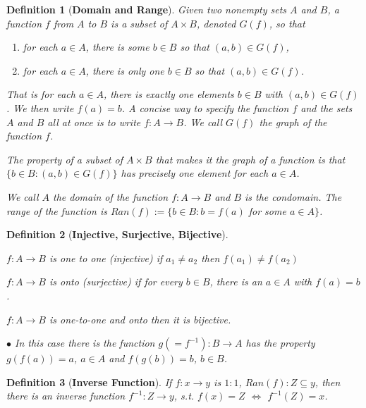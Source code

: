 \documentclass[12pt]{article}
\theoremstyle{plain}
\newtheorem{definition}{Definition}[section]
\begin{document}
	\begin{definition}[\textbf{Domain and Range}]
		Given two nonempty sets $A$ and $B$, a function $f$ from $A$ to $B$ is a 
		subset of $A \times B$, denoted $G(f)$, so that
		\begin{enumerate}
			\item for each $a\in A$, there is some $b\in B$ so that $(a,b) \in G(f)$,
			\item for each $a\in A$, there is only one $b\in B$ so that $(a,b) \in 
				G(f)$.
		\end{enumerate}
		That is for each $a\in A$, there is exactly one elements $b\in B$ with 
		$(a,b)\in G(f)$. We then write $f(a)=b$. A concise way to specify the 
		function $f$ and the sets $A$ and $B$ all at once is to write $f:A\to B$.
		We call $G(f)$ the graph of the function $f$. 

		The property of a subset of $A\times B$ that makes it the graph of a 
		function is that $\{b \in B : (a,b) \in G(f)\}$ has precisely one element
		for each $a\in A$.

		We call $A$ the domain of the function $f: A\to B$ and $B$ is the condomain.
		The range of the function is $Ran(f):=\{b\in B : b= f(a)$
		for some $a\in A \}$.\\
	\end{definition}

	\begin{definition}[\textbf{Injective, Surjective, Bijective}]
		$ $
		\begin{description}
		\item $f: A\to B$ is one to one (injective) if $a_1\neq a_2$ 
			then $f(a_1)\neq f(a_2)$ 
		\item $f: A\to B$ is onto (surjective) if for every $b\in B$, 
			there is an $a\in A$ with $f(a)=b$. 
		\item $f: A \to B$ is one-to-one and onto then it is bijective.
			
			$\bullet$ In this case there is the function $g(=f^{-1}): B\to A$
			has the property $g(f(a))=a$, $a\in A$ and $f(g(b)) = b$, $b\in B$.\\
		\end{description}
	\end{definition}

	\begin{definition}[\textbf{Inverse Function}]
		If $f:x \to y$ is $1:1$, $Ran(f): Z\subseteq y$, then there is an inverse 
		function $f^{-1}:Z \to y$, s.t. $f(x)=Z$ $\iff $ $f^{-1}(Z)=x$. \\
	\end{definition}
\end{document}
